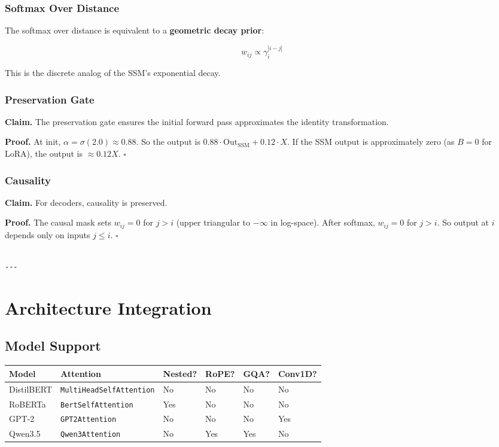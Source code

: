 \subsubsection{Softmax Over Distance}

The softmax over distance is equivalent to a \textbf{geometric decay prior}:

\[
w_{ij} \propto \gamma_i^{|i - j|}
\tag{4.16}
\]

This is the discrete analog of the SSM's exponential decay.

\subsubsection{Preservation Gate}

\textbf{Claim.} The preservation gate ensures the initial forward pass approximates 
the identity transformation.

\textbf{Proof.} At init, $\alpha = \sigma(2.0) \approx 0.88$. So the output is 
$0.88 \cdot \text{Out}_\text{SSM} + 0.12 \cdot X$. If the SSM output is 
approximately zero (as $B = 0$ for LoRA), the output is $\approx 0.12 X$. 
$\square$

\subsubsection{Causality}

\textbf{Claim.} For decoders, causality is preserved.

\textbf{Proof.} The causal mask sets $w_{ij} = 0$ for $j > i$ (upper triangular 
to $-\infty$ in log-space). After softmax, $w_{ij} = 0$ for $j > i$. So 
output at $i$ depends only on inputs $j \leq i$. $\square$
\begin{lstlisting}

---
\end{lstlisting}

\section{Architecture Integration}

\subsection{Model Support}

\begin{table}[H]
\centering
\small
\begin{tabular}{llllll}
\toprule
\textbf{Model} & \textbf{Attention} & \textbf{Nested?} & \textbf{RoPE?} & \textbf{GQA?} & \textbf{Conv1D?} \\
\midrule
DistilBERT & \texttt{MultiHeadSelfAttention} & No & No & No & No \\
RoBERTa & \texttt{BertSelfAttention} & Yes & No & No & No \\
GPT-2 & \texttt{GPT2Attention} & No & No & No & Yes \\
Qwen3.5 & \texttt{Qwen3Attention} & No & Yes & Yes & No \\
\bottomrule
\end{tabular}
\end{table}

